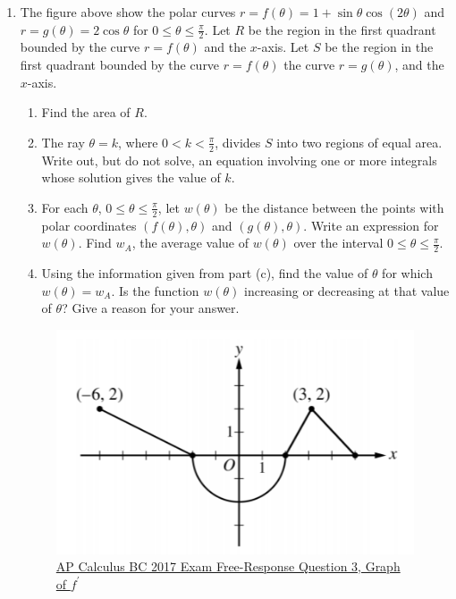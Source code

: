 \begin{enumerate}
	\item The figure above show the polar curves $r=f(\theta)=1+\sin{\theta}\cos{(2\theta)}$ and $r=g(\theta)=2\cos{\theta}$ for $0 \leq \theta \leq \frac{\pi}{2}$.
		Let $R$ be the region in the first quadrant bounded by the curve $r=f(\theta)$ and the $x$-axis.
		Let $S$ be the region in the first quadrant bounded by the curve $r=f(\theta)$ the curve $r=g(\theta)$, and the $x$-axis.
		\begin{enumerate}
			\item Find the area of $R$.
			\item The ray $\theta = k$, where $0 < k < \frac{\pi}{2}$, divides $S$ into two regions of equal area.
				Write out, but do not solve, an equation involving one or more integrals whose solution gives the value of $k$.
			\item For each $\theta$, $0 \leq \theta \leq \frac{\pi}{2}$, let $w(\theta)$ be the distance between the points with polar coordinates $(f(\theta),\theta)$ and $(g(\theta),\theta)$.
				Write an expression for $w(\theta)$.
				Find $w_A$, the average value of $w(\theta)$ over the interval $0 \leq \theta \leq \frac{\pi}{2}$.
			\item Using the information given from part (c), find the value of $\theta$ for which $w(\theta)=w_A$.
				Is the function $w(\theta)$ increasing or decreasing at that value of $\theta$?
				Give a reason for your answer.
		\end{enumerate}
	
	\begin{figure}[H]
		\label{2017_2}
		\centering
		\includegraphics{./additional_materials/2017_3.png}
		\caption{\hyperref{https://apcentral.collegeboard.org/pdf/ap-calculus-bc-frq-2017.pdf}{}{}{AP Calculus BC 2017 Exam Free-Response Question 3, Graph of $f^\prime$}}
	\end{figure}
	

\end{enumerate}
